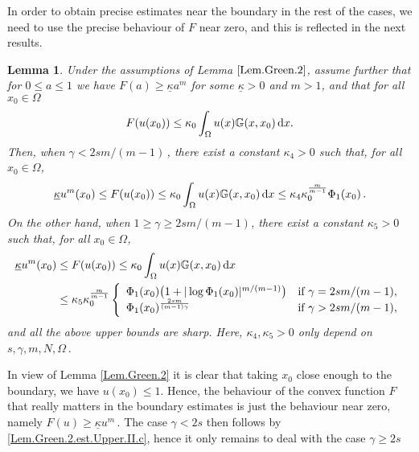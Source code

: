 \documentclass[11pt]{article}
\newtheorem{lem}[thm]{Lemma}
\numberwithin{equation}{section}
\newcommand{\dx}{\,{\rm d}x}
\newcommand{\n}{F}
\newcommand{\kb}{\underline{\kappa}}
\newcommand{\K}{{\mathbb G}}
\begin{document}
In order to obtain precise estimates near the boundary in the rest of the cases, we need to use the precise behaviour of $\n$ near zero, and this is reflected in the next results.
\begin{lem}\label{Lem.Green.2b}Under the assumptions of Lemma $\ref{Lem.Green.2}$, assume further that for $0\leq a\le 1 $ we have $F(a)\ge \kb a^m$ for some $\kb>0$ and $m>1$, and that for all $x_0\in\Omega$
\begin{equation}\label{Lem.Green.2.hyp.b}
\n(u(x_0))\le \kappa_0\int_{\Omega} u(x)\K(x,x_0)\dx.
\end{equation}
Then, when $\gamma<2sm/(m-1)$\,, there exist a constant $\kappa_4>0$ such that, for all $x_0\in \Omega$,
\begin{equation}\label{Lem.Green.2.est.Upper.II.b1}
\kb u^{m}(x_0) \le \n(u(x_0))\le \kappa_0\int_{\Omega} u(x)\K(x,x_0)\dx\le \kappa_4\kappa_0^{\frac{m}{m-1}}\Phi_1(x_0)\,.
\end{equation}
On the other hand, when $1\ge \gamma\geq  2s m/(m-1)$, there exist a constant $\kappa_5>0$ such that, for all $x_0\in \Omega$,
\begin{equation}\label{Lem.Green.3.est.Lower.II.b}
\begin{split}
\kb u^{m}(x_0) &\le \n(u(x_0))\le \kappa_0\int_{\Omega} u(x)\K(x,x_0)\dx\\
&\le
\kappa_{5} \kappa_0^{\frac{m}{m-1}}
\left\{
\begin{array}{ll}
\Phi_1(x_0)\big(1+|\log \Phi_1(x_0)|^{m/(m-1)}\big)&\text{if $\gamma= 2s m/(m-1)$},\\
\Phi_1(x_0)^{\frac{2sm}{(m-1)\gamma}}&\text{if $\gamma> 2s m/(m-1)$},\\
\end{array}
\right.
\end{split}
\end{equation}
and all the above upper bounds are sharp.
Here, $\kappa_4,\kappa_5>0$ only depend on $s,\gamma, m, N,\Omega$\,.
\end{lem}

In view of Lemma \ref{Lem.Green.2} it is clear that taking $x_0$ close enough to the boundary, we have $u(x_0)\le 1$. Hence, the behaviour of the convex function $\n$ that really matters in the boundary estimates is just the behaviour near zero, namely $\n(u)\ge \kb u^m$\,. The case $\gamma<2s$ then follows by \eqref{Lem.Green.2.est.Upper.II.c}, hence it only remains to  deal with the case $\gamma\ge 2s$
\end{document}
